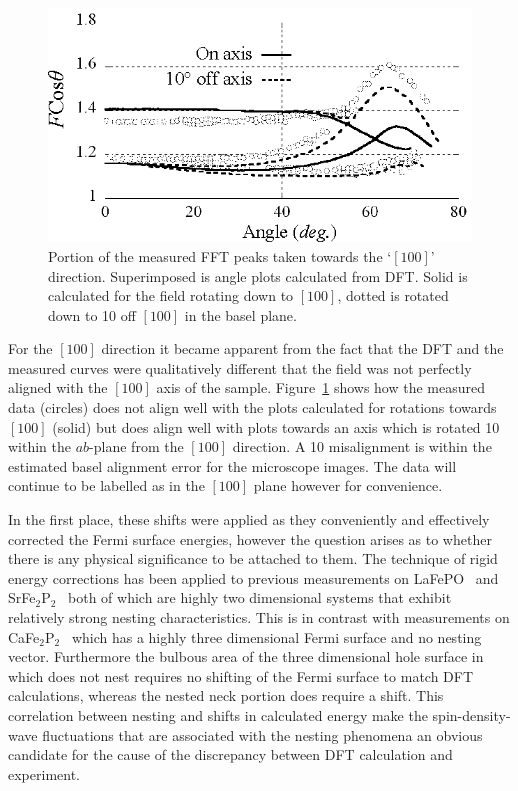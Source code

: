 \begin{figure}[htbp]
    \begin{center}
        \includegraphics[scale=0.9]{Chapter-dHvABaFe2P2/Figures/AngleDepMeasurements/BaselMisalignment/BaselMisalignment}
        \caption{Portion of the measured \ac{FFT} peaks taken towards the `$[100]$' direction. Superimposed is angle plots calculated from \ac{DFT}. Solid is calculated for the field rotating down to $[100]$, dotted is rotated down to \unit{10}{\degree} off $[100]$ in the basel plane.}
        \label{Fig:ResD:BaselMisalignment}
    \end{center}
\end{figure}
For the $[100]$ direction it became apparent from the fact that the \ac{DFT} and the measured curves were qualitatively different that the field was not perfectly aligned with the $[100]$ axis of the sample. Figure~\ref{Fig:ResD:BaselMisalignment} shows how the measured data (circles) does not align well with the plots calculated for rotations towards $[100]$ (solid) but does align well with plots towards an axis which is rotated \unit{10}{\degree} within the $ab$-plane from the $[100]$ direction. A \unit{10}{\degree} misalignment is within the estimated basel alignment error for the microscope images. The data will continue to be labelled as in the $[100]$ plane however for convenience.

In the first place, these shifts were applied as they conveniently and effectively corrected the Fermi surface energies, however the question arises as to whether there is any physical significance to be attached to them. The technique of rigid energy corrections has been applied to previous measurements on LaFePO~\cite{Carrington2009} and SrFe$_2$P$_2$~\cite{Analytis2009} both of which are highly two dimensional systems that exhibit relatively strong nesting characteristics. This is in contrast with measurements on CaFe$_2$P$_2$~\cite{Coldea2009} which has a highly three dimensional Fermi surface and no nesting vector. Furthermore the bulbous area of the three dimensional hole surface in \BaFeP{} which does not nest requires no shifting of the Fermi surface to match \ac{DFT} calculations, whereas the nested neck portion does require a shift. This correlation between nesting and shifts in calculated energy make the spin-density-wave fluctuations that are associated with the nesting phenomena an obvious candidate for the cause of the discrepancy between \ac{DFT} calculation and experiment.



